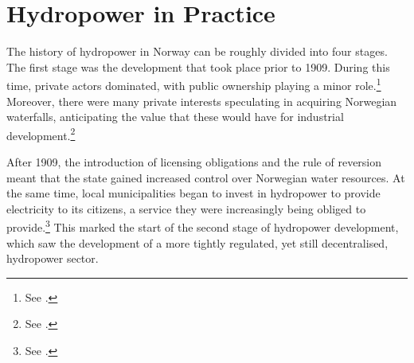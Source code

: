 %
%
%
%
%
%

\section{Hydropower in Practice}

The history of hydropower in Norway can be roughly divided into four stages. The first stage was the development that took place prior to 1909. During this time, private actors dominated, with public ownership playing a minor role.\footnote{See \cite{otprp61}.} Moreover, there were many private interests speculating in acquiring Norwegian waterfalls, anticipating the value that these would have for industrial development.\footnote{See \cite[30-31]{nou04}.}

After 1909, the introduction of licensing obligations and the rule of reversion meant that the state gained increased control over Norwegian water resources. At the same time, local municipalities began to invest in hydropower to provide electricity to its citizens, a service they were increasingly being obliged to provide.\footnote{See \cite{otprp61}.} This marked the start of the second stage of hydropower development, which saw the development of a more tightly regulated, yet still decentralised, hydropower sector.

